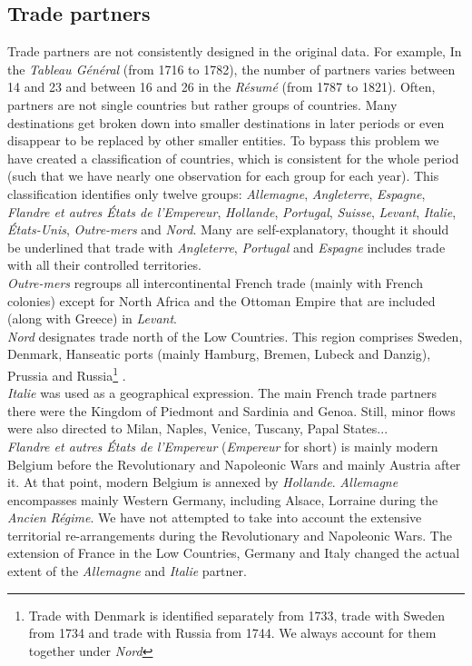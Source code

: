 \documentclass[12pt,a4paper,notitlepage,english]{article}
\begin{document}
\subsection{Trade partners} \label{figures}
Trade partners are not consistently designed in the original data. 
For example, In the \textit{Tableau Général} (from 1716 to 1782), the number of partners varies between 14 and 23 and between  16 and 26 in the \textit{Résumé} (from 1787 to 1821).
Often, partners are not single countries but rather groups of countries.
Many destinations get broken down into smaller destinations in later periods or even disappear to be replaced by other smaller entities.
To bypass this problem we have created a classification of countries, which is consistent for the whole period (such that we have nearly one observation for each group for each year).
This classification identifies only twelve groups: \textit{Allemagne}, \textit{Angleterre}, \textit{Espagne}, \textit{Flandre et autres États de l'Empereur}, \textit{Hollande}, \textit{Portugal}, \textit{Suisse}, \textit{Levant}, \textit{Italie},  \textit{États-Unis}, \textit{Outre-mers} and \textit{Nord}. Many are self-explanatory, thought it should be underlined that trade with \textit{Angleterre}, \textit{Portugal} and \textit{Espagne} includes trade with all their controlled territories. \\
\textit{Outre-mers} regroups all intercontinental French trade (mainly with French colonies) except for North Africa and the Ottoman Empire that are included (along with Greece) in  \textit{Levant}.\\
\textit{Nord} designates trade north of the Low Countries.
This region comprises Sweden, Denmark, Hanseatic ports (mainly Hamburg, Bremen, Lubeck and Danzig), Prussia and Russia\footnote{Trade with Denmark is identified separately from 1733, trade with Sweden from 1734 and trade with Russia from 1744.
We always account for them together under \textit{Nord}} \citep{charles2018cross}.\\
\textit{Italie} was used as a geographical expression.
The main French trade partners there were the Kingdom of Piedmont and Sardinia and Genoa.
Still, minor flows were also directed to Milan, Naples, Venice, Tuscany, Papal States...\\
\textit{Flandre et autres États de l'Empereur}  (\textit{Empereur} for short) is mainly modern Belgium before the Revolutionary and Napoleonic Wars and mainly Austria after it. At that point, modern Belgium is annexed by \textit{Hollande}.
\textit{Allemagne} encompasses mainly Western Germany, including Alsace, Lorraine during the \textit{Ancien Régime}.
We have not attempted to take into account the extensive territorial re-arrangements during the Revolutionary and Napoleonic Wars.
The extension of France in the Low Countries, Germany and Italy changed the actual extent of the \textit{Allemagne} and \textit{Italie} partner.
\end{document}
